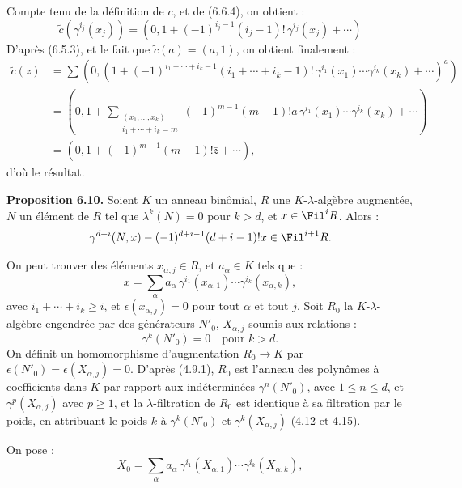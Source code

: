 Compte tenu de la définition de \(c\), et de (6.6.4), on obtient :
\[
  \widetilde c(\gamma^{i_j}(x_j))
  =
  \left(0,1+(-1)^{i_j-1}(i_j-1)!\,\gamma^{i_j}(x_j)+\cdots\right)
\]
D'après (6.5.3), et le fait que \(\widetilde c(a)=(a,1)\), on obtient finalement :
\[
\begin{aligned}
\widetilde c(z)
&=\sum
\left(0,\left(1+
(-1)^{i_1+\cdots+i_k-1}
(i_1+\cdots+i_k-1)!
\,\gamma^{i_1}(x_1)\cdots\gamma^{i_k}(x_k)
+\cdots\right)^a\right)\\
&=
\left(0,1+
\sum_{\substack{(x_1,\ldots,x_k)\\ i_1+\cdots+i_k=m}}
(-1)^{m-1}(m-1)!a\,\gamma^{i_1}(x_1)\cdots\gamma^{i_k}(x_k)
+\cdots\right)\\
&=
(0,1+(-1)^{m-1}(m-1)!\bar z+\cdots),
\end{aligned}
\]
d'où le résultat.

\textbf{Proposition 6.10.} Soient \(K\) un anneau binômial, \(R\) une \(K\)-\(\lambda\)-algèbre augmentée, \(N\) un élément de \(R\) tel que \(\lambda^k(N)=0\) pour \(k>d\), et \(x\in\Fil^iR\). Alors :
\[
  \gamma^{d+i}(N,x)-(-1)^{d+i-1}(d+i-1)!x\in\Fil^{i+1}R.
\]

On peut trouver des éléments \(x_{\alpha,j}\in R\), et \(a_\alpha\in K\) tels que :
\[
  x=\sum_\alpha a_\alpha\,
       \gamma^{i_1}(x_{\alpha,1})\cdots
       \gamma^{i_k}(x_{\alpha,k}),
\]
avec \(i_1+\cdots+i_k\ge i\), et \(\epsilon(x_{\alpha,j})=0\) pour tout \(\alpha\) et tout \(j\). Soit \(R_0\) la \(K\)-\(\lambda\)-algèbre engendrée par des générateurs \(N'_0\), \(X_{\alpha,j}\) soumis aux relations :
\[
  \gamma^k(N'_0)=0\quad\text{pour }k>d.
\]
On définit un homomorphisme d'augmentation \(R_0\to K\) par \(\epsilon(N'_0)=\epsilon(X_{\alpha,j})=0\). D'après (4.9.1), \(R_0\) est l'anneau des polynômes à coefficients dans \(K\) par rapport aux indéterminées \(\gamma^n(N'_0)\), avec \(1\le n\le d\), et \(\gamma^p(X_{\alpha,j})\) avec \(p\ge1\), et la \(\lambda\)-filtration de \(R_0\) est identique à sa filtration par le poids, en attribuant le poids \(k\) à \(\gamma^k(N'_0)\) et \(\gamma^k(X_{\alpha,j})\) (4.12 et 4.15).

On pose :
\[
  X_0=\sum_\alpha a_\alpha\,
       \gamma^{i_1}(X_{\alpha,1})\cdots
       \gamma^{i_k}(X_{\alpha,k}),
\]
